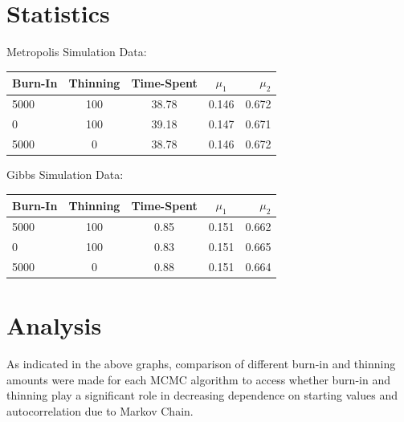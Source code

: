 \documentclass[11pt,a4paper]{article}
\begin{document}

\section*{Statistics}

\begin{center}
Metropolis Simulation Data: \\ 
  \begin{tabular}{ | l | c | c | c | r | }
    \hline
    Burn-In & Thinning & Time-Spent & $\mu_{1}$ & $\mu_{2}$ \\ \hline
    5000 & 100 & 38.78 & 0.146 & 0.672 \\ \hline
    0 & 100 & 39.18 & 0.147 & 0.671 \\ \hline
    5000 & 0 & 38.78 & 0.146 & 0.672 \\ 
    \hline
  \end{tabular}
\end{center}

\begin{center}
Gibbs Simulation Data: \\
  \begin{tabular}{ | l | c | c | c | r | }
    \hline
    Burn-In & Thinning & Time-Spent & $\mu_{1}$ & $\mu_{2}$ \\ \hline
    5000 & 100 & 0.85 & 0.151 & 0.662 \\ \hline
    0 & 100 & 0.83 & 0.151 & 0.665\\ \hline
    5000 & 0 & 0.88 & 0.151 & 0.664 \\ 
    \hline
  \end{tabular}
\end{center}



\newpage


\section*{Analysis}
As indicated in the above graphs, comparison of different burn-in and thinning amounts were made for each MCMC algorithm to access whether burn-in and thinning play a significant role in decreasing dependence on starting values and autocorrelation due to Markov Chain. \\
\end{document}
